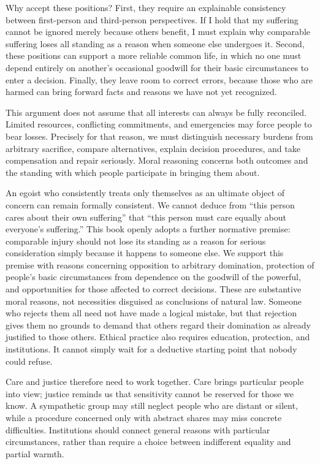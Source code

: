 \documentclass[
  english,
  11pt,
  oneside]{book}
\begin{document}
Why accept these positions? First, they require an explainable consistency between first-person and third-person perspectives. If I hold that my suffering cannot be ignored merely because others benefit, I must explain why comparable suffering loses all standing as a reason when someone else undergoes it. Second, these positions can support a more reliable common life, in which no one must depend entirely on another's occasional goodwill for their basic circumstances to enter a decision. Finally, they leave room to correct errors, because those who are harmed can bring forward facts and reasons we have not yet recognized.

This argument does not assume that all interests can always be fully reconciled. Limited resources, conflicting commitments, and emergencies may force people to bear losses. Precisely for that reason, we must distinguish necessary burdens from arbitrary sacrifice, compare alternatives, explain decision procedures, and take compensation and repair seriously. Moral reasoning concerns both outcomes and the standing with which people participate in bringing them about.

An egoist who consistently treats only themselves as an ultimate object of concern can remain formally consistent. We cannot deduce from ``this person cares about their own suffering'' that ``this person must care equally about everyone's suffering.'' This book openly adopts a further normative premise: comparable injury should not lose its standing as a reason for serious consideration simply because it happens to someone else. We support this premise with reasons concerning opposition to arbitrary domination, protection of people's basic circumstances from dependence on the goodwill of the powerful, and opportunities for those affected to correct decisions. These are substantive moral reasons, not necessities disguised as conclusions of natural law. Someone who rejects them all need not have made a logical mistake, but that rejection gives them no grounds to demand that others regard their domination as already justified to those others. Ethical practice also requires education, protection, and institutions. It cannot simply wait for a deductive starting point that nobody could refuse.

Care and justice therefore need to work together. Care brings particular people into view; justice reminds us that sensitivity cannot be reserved for those we know. A sympathetic group may still neglect people who are distant or silent, while a procedure concerned only with abstract shares may miss concrete difficulties. Institutions should connect general reasons with particular circumstances, rather than require a choice between indifferent equality and partial warmth.
\end{document}
